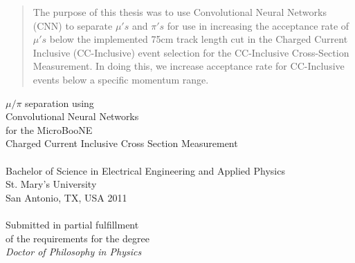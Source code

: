\documentclass[hyperpdf,bindnopdf,usenames,dvipsnames,svgnames,table,longbibliography]{hepthesis}
\begin{document}
\begin{frontmatter}

\let\cleardoublepage\clearpage
\begin{abstract}%
  \thispagestyle{empty}
The purpose of this thesis was to use Convolutional Neural Networks (CNN) to separate $\mu'{s}$ and $\pi'{s}$ for use in increasing the acceptance rate of $\mu'{s}$ below the implemented 75cm track length cut in the Charged Current Inclusive (CC-Inclusive) event selection for the CC-Inclusive Cross-Section Measurement. In doing this, we increase acceptance rate for CC-Inclusive events below a specific momentum range.
\end{abstract}
\let\cleardoublepage\clearpage
\newpage
\begin{center}
\vspace*{0.2cm}
\noindent\makebox[\linewidth]{\rule{\textwidth}{0.3pt}}
{\huge %
$\mu/\pi$ separation using\\ Convolutional Neural Networks \\for the MicroBooNE\\Charged Current Inclusive Cross Section Measurement 
}
\noindent\makebox[\linewidth]{\rule{\textwidth}{0.3pt}}\\ %
\vspace{0.5cm}
\vspace{0.5cm}
\\[6pt]
Bachelor of Science in Electrical Engineering and Applied Physics\\
St. Mary's University\\
San Antonio, TX, USA 2011\\
\vspace{1.3cm}
\\[6pt]
Submitted in partial fulfillment\\
of the requirements for the degree\\
\emph{Doctor of Philosophy in Physics}\\


\end{center}
\end{frontmatter}
\end{document}
